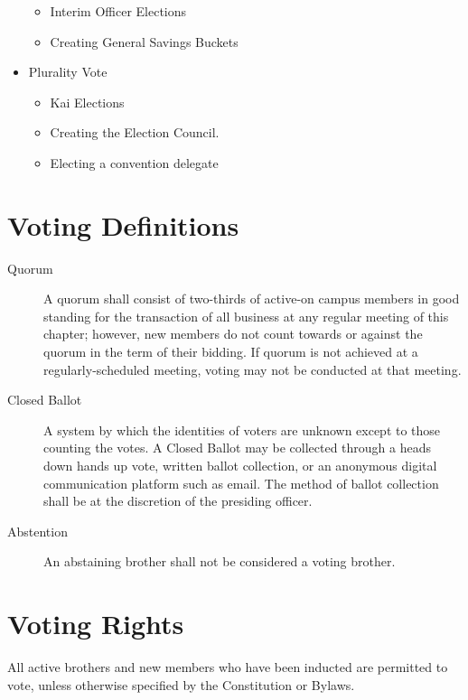 \begin{itemize}
\begin{itemize}
            \item Interim Officer Elections
            \item Creating General Savings Buckets
        \end{itemize}
    \item[] Plurality Vote
        \begin{itemize}
            \item Kai Elections
            \item Creating the Election Council.
            \item Electing a convention delegate
        \end{itemize}
\end{itemize}

\section{Voting Definitions}
\label{sec:voting-definitions}

\begin{description} \item[Quorum] A quorum shall consist of two-thirds of
        active-on campus members in good standing for the transaction of all
        business at any regular meeting of this chapter; however, new members do
        not count towards or against the quorum in the term of their bidding.
        If quorum is
        not achieved at a regularly-scheduled meeting, voting may not be
        conducted at that meeting.

    \item[Closed Ballot] A system by which the identities of voters are unknown
        except to those counting the votes.
        A Closed Ballot may be collected through a heads down hands up vote,
        written ballot collection, or an anonymous digital communication
        platform such as email.
        The method of ballot collection shall be at the discretion of the
        presiding officer.

    \item[Abstention] An abstaining brother shall not be considered a voting
        brother.
\end{description}

\section{Voting Rights}
\label{sec:voting-rights}

All active brothers and new members who have been inducted are permitted to
vote, unless otherwise specified by the Constitution or Bylaws.

